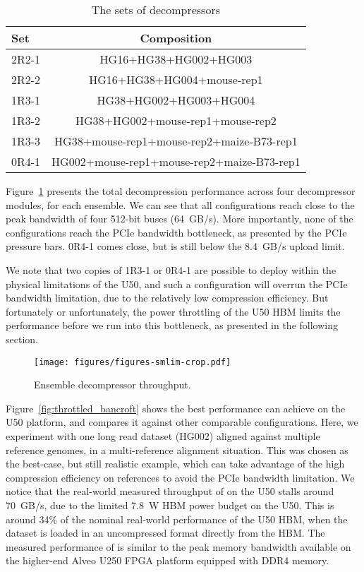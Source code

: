 \begin{table}[htb]
    \centering
    \caption{The sets of decompressors}
    \label{tab:decompressor_set_1}
    \begin{tabular}{|l|c|}
        \hline
         Set & Composition \\
        \hline
         2R2-1 & HG16+HG38+HG002+HG003 \\
         2R2-2 & HG16+HG38+HG004+mouse-rep1 \\
         1R3-1 & HG38+HG002+HG003+HG004 \\
         1R3-2 & HG38+HG002+mouse-rep1+mouse-rep2 \\
         1R3-3 & HG38+mouse-rep1+mouse-rep2+maize-B73-rep1 \\
         0R4-1 & HG002+mouse-rep1+mouse-rep2+maize-B73-rep1 \\
        \hline
    \end{tabular}
\end{table}

Figure~\ref{fig:ensemble_decompressor_throughput} presents the total decompression performance across four decompressor modules, for each ensemble.
We can see that all configurations reach close to the peak bandwidth of four 512-bit buses (64~GB/s).
More importantly, none of the configurations reach the PCIe bandwidth bottleneck, as presented by the PCIe pressure bars.
0R4-1 comes close, but is still below the 8.4~GB/s upload limit.

We note that two copies of 1R3-1 or 0R4-1 are possible to deploy within the physical limitations of the U50, and such a configuration will overrun the PCIe bandwidth limitation, due to the relatively low compression efficiency.
But fortunately or unfortunately, the power throttling of the U50 HBM limits the performance before we run into this bottleneck, as presented in the following section.

\begin{figure}[htb]
    \centering
    \texttt{[image: figures/figures-smlim-crop.pdf]}
    \caption{Ensemble decompressor throughput.}
    \label{fig:ensemble_decompressor_throughput}
\end{figure}

Figure~\ref{fig:throttled_bancroft} shows the best performance \name{} can achieve on the U50 platform, and compares it against other comparable configurations.
Here, we experiment with one long read dataset (HG002) aligned against multiple reference genomes, in a multi-reference alignment situation.
This was chosen as the best-case, but still realistic example, which can take advantage of the high compression efficiency on references to avoid the PCIe bandwidth limitation.
We notice that the real-world measured throughput of \name{} on the U50 stalls around 70~GB/s, due to the limited 7.8~W HBM power budget on the U50.
This is around 34\% of the nominal real-world performance of the U50 HBM, when the dataset is loaded in an uncompressed format directly from the HBM.
The measured performance of \name{} is similar to the peak memory bandwidth available on the higher-end Alveo U250 FPGA platform equipped with DDR4 memory.

